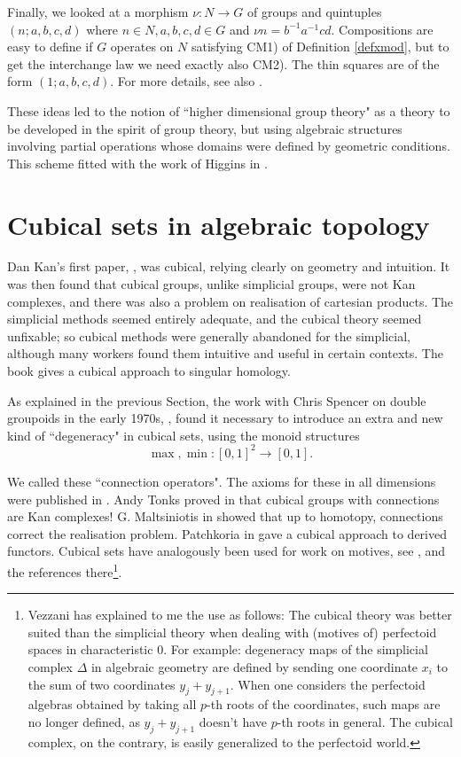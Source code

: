 \documentclass{elsarticle}
\begin{document}
  Finally, we looked at
a morphism $\nu : N \to G$ of groups and quintuples $(n; a, b, c, d)$ where $ n \in  N, a, b, c, d\in G $ and
$\nu n = b^{-1}a^{-1}cd$.
Compositions are easy to define if $G$ operates on $N$ satisfying CM1) of Definition \ref{defxmod}, but to get
the interchange law we need exactly also CM2). The thin squares are of the form $(1; a, b, c, d)$.
For more details, see also \cite{BrownMosaTAC}.

These ideas led to the notion of ``higher dimensional group theory" as a theory to be developed in the
spirit of group theory, but using algebraic structures involving partial operations
whose domains were defined by geometric conditions.   This scheme fitted with the work of
Higgins in \cite{Higgins-algebrawithoperators}.

\section{Cubical sets in algebraic topology}\label{sec:cubsets}
Dan Kan's first paper, \cite{Kan55}, was cubical, relying clearly on geometry and intuition.  It was
then found that cubical groups, unlike simplicial groups, were not Kan complexes, and there
was also a problem on realisation of cartesian products.  The simplicial methods seemed entirely adequate,
and the cubical theory seemed unfixable; so cubical methods were generally
abandoned for the simplicial, although many workers found them intuitive and useful in certain contexts. The book \cite{Mas80} gives a cubical approach to singular homology.

As explained in the previous Section, the work with Chris Spencer on double groupoids in the early 1970s, \cite{BS76}, found it
necessary to introduce an extra and new kind of ``degeneracy" in cubical sets, using the monoid structures
$$ \max, \min : [0, 1]^2 \to [0,1].$$

We called these ``connection operators". The  axioms for these in all dimensions were published in \cite{BH81algcub}.
Andy Tonks proved in \cite{tonks-cubgps}  that cubical groups with connections are Kan complexes!
G. Maltsiniotis in \cite{maltsin-cubandconn} showed that up to homotopy, connections correct the realisation
problem. Patchkoria in \cite{Pat12}  gave a cubical approach to derived functors. Cubical sets have
analogously been used for work on motives, see \cite{Vez14},  and the references there\footnote{Vezzani has explained to me the use as follows:
The cubical theory was better suited than the simplicial
theory when dealing with (motives of) perfectoid spaces in characteristic $0$.  For example: degeneracy maps of
the simplicial complex $\Delta$  in algebraic geometry are defined by sending one coordinate $x_ i$  to the sum of two
coordinates $y _j + y_{j+1}$.  When one considers the perfectoid algebras obtained by taking all $p$-th roots of the
coordinates, such maps are no longer defined, as $y _j + y_{ j+1}$  doesn't have $p$-th roots in general.  The cubical
complex, on the contrary, is easily generalized to the perfectoid world.}.
\end{document}
